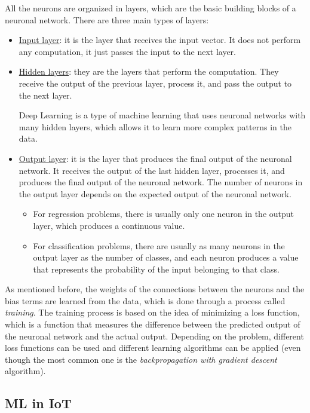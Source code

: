 All the neurons are organized in layers, which are the basic building blocks of a neuronal network. There are three main types of layers:
\begin{itemize}
    \item \ul{Input layer}: it is the layer that receives the input vector. It does not perform any computation, it just passes the input to the next layer.
    \item \ul{Hidden layers}: they are the layers that perform the computation. They receive the output of the previous layer, process it, and pass the output to the next layer.
    
    Deep Learning is a type of machine learning that uses neuronal networks with many hidden layers, which allows it to learn more complex patterns in the data.
    \item \ul{Output layer}: it is the layer that produces the final output of the neuronal network. It receives the output of the last hidden layer, processes it, and produces the final output of the neuronal network. The number of neurons in the output layer depends on the expected output of the neuronal network.
    \begin{itemize}
        \item For regression problems, there is usually only one neuron in the output layer, which produces a continuous value.
        \item For classification problems, there are usually as many neurons in the output layer as the number of classes, and each neuron produces a value that represents the probability of the input belonging to that class.
    \end{itemize}
\end{itemize}

As mentioned before, the weights of the connections between the neurons and the bias terms are learned from the data, which is done through a process called \emph{training}. The training process is based on the idea of minimizing a loss function, which is a function that measures the difference between the predicted output of the neuronal network and the actual output. Depending on the problem, different loss functions can be used and different learning algorithms can be applied (even though the most common one is the \emph{backpropagation with gradient descent} algorithm).

\subsection{ML in IoT}

